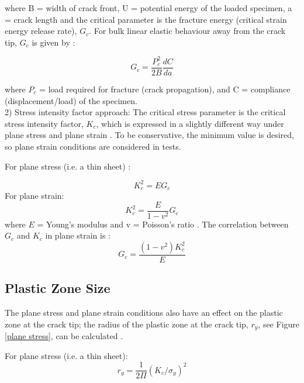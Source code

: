 \documentclass[numbers=noendperiod,chapterprefix=on]{icldt} %
\begin{document}
where B = width of crack front, U = potential energy of the loaded specimen, a = crack length and the critical parameter is the fracture energy (critical strain energy release rate), $G_c$. 
For bulk linear elastic behaviour away from the crack tip, $G_c$ is given by \cite{Chong2015}:

\begin{equation} \label{fracture energy}
G_c=\frac{P^2_c}{2B} \frac{dC}{da}
\end{equation}

where $P_{c}$ = load required for fracture (crack propagation), and C = compliance (displacement/load) of the specimen. \\
2) Stress intensity factor approach: The critical stress parameter is the critical stress intensity factor, $K_{c}$, which is expressed in a slightly different way under plane stress and plane strain \cite{Bandyopadhyay1990a}. To be conservative, the minimum value is desired, so plane strain conditions are considered in tests.
 
For plane stress (i.e. a thin sheet) \cite{Chong2015}: 

\begin{equation} \label{plane stress}
K_c^2=E G_c
\end{equation}
For plane strain:
\begin{equation} \label{plane strain}
K_c^2=\frac{E}{1-v^2} G_c
\end{equation}
where $E$ = Young's modulus and v = Poisson's ratio \cite{Bandyopadhyay1990a}.
The correlation between $G_{c}$ and $K_{c}$ in plane strain is \cite{Mohammed2007,D50232007}:
\begin{equation} \label{correlation}
G_c = \frac{(1-v^2) K_c^2}{E} 
\end{equation}

\subsection{Plastic Zone Size}

The plane stress and plane strain conditions also have an effect on the plastic zone at the crack tip; the radius of the plastic zone at the crack tip, $r_y$, see Figure \ref{plane stress}, can be calculated \cite{Mohammed2007,Kinloch1990}. 

For plane stress (i.e. a thin sheet):
\begin{equation} \label{ry plane stress}
r_y=\frac{1}{2\Pi}(K_c/\sigma_y)^2
\end{equation}
\end{document}
